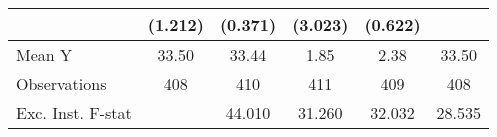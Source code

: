 {\begin{tabular}{l*{5}{c}}
            &     (1.212)         &     (0.371)         &     (3.023)         &     (0.622)         &                     \\
\midrule
Mean Y      &       33.50         &       33.44         &        1.85         &        2.38         &       33.50         \\
Observations&         408         &         410         &         411         &         409         &         408         \\
Exc. Inst. F-stat&                     &      44.010         &      31.260         &      32.032         &      28.535         \\
\bottomrule
\end{tabular}
}
